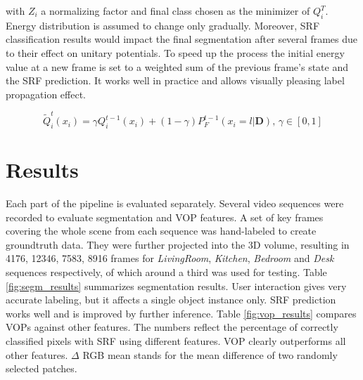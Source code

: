 \documentclass{llncs}
\begin{document}
with $Z_i$ a normalizing factor and final class chosen as the minimizer of $Q_i^T$. Energy distribution is assumed to change only gradually. Moreover, SRF classification results would impact the final segmentation after several frames due to their effect on unitary potentials. To speed up the process the initial energy value at a new frame is set to a weighted sum of the previous frame's state and the SRF prediction. It works well in practice and allows visually pleasing label propagation effect.

\begin{equation}
 \widetilde{Q}_i^t(x_i) = \gamma Q_i^{t-1}(x_i) + (1 - \gamma) P_F^{t-1}(x_i = l | \mathbf{D}) \text{, } \gamma \in [0, 1]
\end{equation}

% 

\section{Results}
  Each part of the pipeline is evaluated separately. Several video sequences were recorded to evaluate segmentation and VOP features. A set of key frames covering the whole scene from each sequence was hand-labeled to create groundtruth data. They were further projected into the 3D volume, resulting in 4176, 12346, 7583, 8916 frames for \emph{LivingRoom}, \emph{Kitchen}, \emph{Bedroom} and \emph{Desk} sequences respectively, of which around a third was used for testing. Table \ref{fig:segm_results} summarizes segmentation results. User interaction gives very accurate labeling, but it affects a single object instance only. SRF prediction works well and is improved by further inference. Table \ref{fig:vop_results} compares VOPs against other features. The numbers reflect the percentage of correctly classified pixels with SRF using different features. VOP clearly outperforms all other features. $\Delta$ RGB mean stands for the mean difference of two randomly selected patches. 
  
\end{document}
